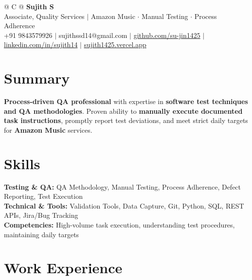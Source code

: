 \documentclass[a4paper,11pt]{article}
\newcommand{\ulink}[2]{\href{#1}{#2}}
\begin{document}
\pagestyle{empty}

\begin{tabularx}{\linewidth}{@{} C @{}}
{\color[HTML]{000000}\fontsize{30}{35}\selectfont\bfseries Sujith S} \\[5pt]
{\fontsize{10.5}{12.5}\selectfont\color[HTML]{3A3A3A}
Associate, Quality Services $|$ Amazon Music $\cdot$ Manual Testing $\cdot$ Process Adherence} \\[6pt]
{\fontsize{9.5}{11.5}\selectfont\textcolor[HTML]{3A3A3A}{+91 9843579926 $|$ sujithssd14@gmail.com $|$ \ulink{https://github.com/su-jin1425}{github.com/su-jin1425} $|$ \ulink{https://linkedin.com/in/sujith14}{linkedin.com/in/sujith14} $|$ \ulink{https://sujith1425.vercel.app}{sujith1425.vercel.app}}}
\end{tabularx}

\section{Summary}
\vspace{2pt}

{\color[HTML]{0A0A0A}\fontsize{11}{14}\selectfont
\textbf{Process-driven QA professional} with expertise in \textbf{software test techniques and QA methodologies}. Proven ability to \textbf{manually execute documented task instructions}, promptly report test deviations, and meet strict daily targets for \textbf{Amazon Music} services.}

\section{Skills}
\vspace{2pt}

{\color[HTML]{0A0A0A}\fontsize{11}{14}\selectfont
\textbf{Testing \& QA:} QA Methodology, Manual Testing, Process Adherence, Defect Reporting, Test Execution \\[2pt]
\textbf{Technical \& Tools:} Validation Tools, Data Capture, Git, Python, SQL, REST APIs, Jira/Bug Tracking \\[2pt]
\textbf{Competencies:} High-volume task execution, understanding test procedures, maintaining daily targets}

\section{Work Experience}
\vspace{2pt}
\end{document}
